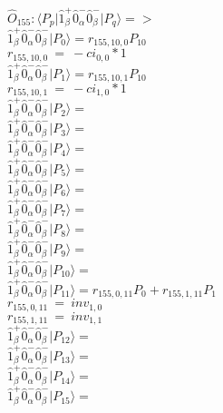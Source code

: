 \documentclass[14pt]{article}
\begin{document}
    $\hat{O}_{155}:  \langle{P_p}\vert \hat{1}_{\beta}^{+}\hat{0}_{\alpha}^{-}\hat{0}_{\beta}^{-} \vert{P_q}\rangle => $ \\ 
    $ \hat{1}_{\beta}^{+}\hat{0}_{\alpha}^{-}\hat{0}_{\beta}^{-} \vert{P_{0}}\rangle = {r}_{155,10,0}P_{10} $ \\ 
    ${r}_{155,10,0}\ =\ -{ci}_{0,0}*1 $ \\ 
    $ \hat{1}_{\beta}^{+}\hat{0}_{\alpha}^{-}\hat{0}_{\beta}^{-} \vert{P_{1}}\rangle = {r}_{155,10,1}P_{10} $ \\ 
    ${r}_{155,10,1}\ =\ -{ci}_{1,0}*1 $ \\ 
    $ \hat{1}_{\beta}^{+}\hat{0}_{\alpha}^{-}\hat{0}_{\beta}^{-} \vert{P_{2}}\rangle =  $ \\ 
    $ \hat{1}_{\beta}^{+}\hat{0}_{\alpha}^{-}\hat{0}_{\beta}^{-} \vert{P_{3}}\rangle =  $ \\ 
    $ \hat{1}_{\beta}^{+}\hat{0}_{\alpha}^{-}\hat{0}_{\beta}^{-} \vert{P_{4}}\rangle =  $ \\ 
    $ \hat{1}_{\beta}^{+}\hat{0}_{\alpha}^{-}\hat{0}_{\beta}^{-} \vert{P_{5}}\rangle =  $ \\ 
    $ \hat{1}_{\beta}^{+}\hat{0}_{\alpha}^{-}\hat{0}_{\beta}^{-} \vert{P_{6}}\rangle =  $ \\ 
    $ \hat{1}_{\beta}^{+}\hat{0}_{\alpha}^{-}\hat{0}_{\beta}^{-} \vert{P_{7}}\rangle =  $ \\ 
    $ \hat{1}_{\beta}^{+}\hat{0}_{\alpha}^{-}\hat{0}_{\beta}^{-} \vert{P_{8}}\rangle =  $ \\ 
    $ \hat{1}_{\beta}^{+}\hat{0}_{\alpha}^{-}\hat{0}_{\beta}^{-} \vert{P_{9}}\rangle =  $ \\ 
    $ \hat{1}_{\beta}^{+}\hat{0}_{\alpha}^{-}\hat{0}_{\beta}^{-} \vert{P_{10}}\rangle =  $ \\ 
    $ \hat{1}_{\beta}^{+}\hat{0}_{\alpha}^{-}\hat{0}_{\beta}^{-} \vert{P_{11}}\rangle = {r}_{155,0,11}P_{0}+{r}_{155,1,11}P_{1} $ \\ 
    ${r}_{155,0,11}\ =\ {inv}_{1,0} $ \\ 
    ${r}_{155,1,11}\ =\ {inv}_{1,1} $ \\ 
    $ \hat{1}_{\beta}^{+}\hat{0}_{\alpha}^{-}\hat{0}_{\beta}^{-} \vert{P_{12}}\rangle =  $ \\ 
    $ \hat{1}_{\beta}^{+}\hat{0}_{\alpha}^{-}\hat{0}_{\beta}^{-} \vert{P_{13}}\rangle =  $ \\ 
    $ \hat{1}_{\beta}^{+}\hat{0}_{\alpha}^{-}\hat{0}_{\beta}^{-} \vert{P_{14}}\rangle =  $ \\ 
    $ \hat{1}_{\beta}^{+}\hat{0}_{\alpha}^{-}\hat{0}_{\beta}^{-} \vert{P_{15}}\rangle =  $ \\ 
    
\end{document}
